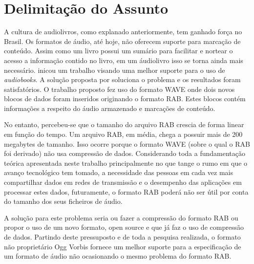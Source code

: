 \chapter[Delimitação do Assunto]{Delimitação do Assunto}\label{cap4}

A cultura de audiolivros, como explanado anteriormente, tem ganhado força no Brasil. Os formatos de áudio, até hoje, não oferecem suporte para marcação de conteúdo. Assim como um livro possui um sumário para facilitar e nortear o acesso a informação contido no livro, em um áudiolivro isso se torna ainda mais necessário. \cite{herbert} inicou um trabalho visando uma melhor suporte para o uso de \textit{audiobooks}. A solução proposta por \cite{herbert} soluciona o problema e os resultados foram satisfatórios. O trabalho proposto fez uso do formato WAVE onde dois novos blocos de dados foram inseridos originando o formato RAB. Estes blocos contém informações a respeito do áudio armazenado e marcações de conteúdo. 

No entanto, percebeu-se que o tamanho do arquivo RAB crescia de forma linear em função do tempo. Um arquivo RAB, em média, chega a possuir mais de 200 megabytes de tamanho. Isso ocorre porque o formato WAVE (sobre o qual o RAB foi derivado) não usa compressão de dados. Considerando toda a fundamentação teórica apresentada neste trabalho principalmente no que tange o rumo em que o avanço tecnológico tem tomado, a necessidade das pessoas em cada vez mais compartilhar dados em redes de transmissão e o desempenho das aplicações em processar estes dados, futuramente, o formato RAB poderá não ser útil por conta do tamanho dos seus 
ficheiros de áudio.

A solução para este problema seria ou fazer a compressão do formato RAB ou propor o uso de um novo formato, open source e que já faz o uso de compressão de dados. Partindo deste pressuposto e de toda a pesquisa realizada, o formato não proprietário Ogg Vorbis fornece um melhor suporte para a especificação de um formato de áudio não ocasionando o mesmo problema do formato RAB.

